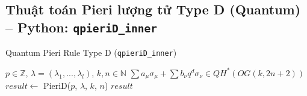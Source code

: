 \subsection*{Thuật toán Pieri lượng tử Type D (Quantum) -- Python: \texttt{qpieriD\_inner}}

\begin{algorithm}[H]
\caption{Quantum Pieri Rule Type D (\texttt{qpieriD\_inner})}
\begin{algorithmic}[1]
\REQUIRE $p \in \mathbb{Z}$, $\lambda = (\lambda_1, ..., \lambda_l)$, $k, n \in \mathbb{N}$
\ENSURE $\sum a_\mu \sigma_\mu + \sum b_\nu q^d \sigma_\nu \in QH^*(OG(k,2n+2))$
\STATE $result \gets$ PieriD($p$, $\lambda$, $k$, $n$) 
\RETURN $result$ %
\end{algorithmic}
\end{algorithm}